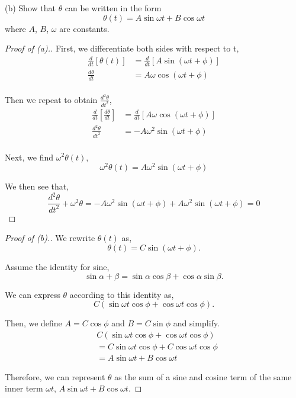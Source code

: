 \documentclass[../hw3.tex]{subfiles}
\begin{document}
(b) Show that $\theta$ can be written in the form
\[\theta(t) = A\sin{\omega t} + B\cos{\omega t}\]
where $A$, $B$, $\omega$ are constants.

\begin{proof}[Proof of (a).]

First, we differentiate both sides with respect to t,
\begin{align*}
    \frac{d}{dt} \left[ \theta(t) \right] &= \frac{d}{dt} \left[ A\sin{(\omega t + \phi)} \right]\\
    \frac{d\theta}{dt} &= A \omega \cos{(\omega t + \phi)} \\
\end{align*}

Then we repeat to obtain $\frac{d^2\theta}{dt^2}$, 
\begin{align*}
    \frac{d}{dt}\left[ \frac{d\theta}{dt} \right] &= \frac{d}{dt} \left[ A \omega \cos{(\omega t + \phi)} \right] \\
    \frac{d^2\theta}{dt^2} &= {-A}\omega^2 \sin{(\omega t + \phi)}\\
\end{align*}

Next, we find $\omega^2 \theta(t)$,
\[\omega^2 \theta(t) = A \omega^2 \sin{(\omega t + \phi)}\]

We then see that,
\[\frac{d^2\theta}{dt^2} + \omega^2 \theta = {-A} \omega^2 \sin{(\omega t + \phi)} + A \omega^2 \sin{(\omega t + \phi)} = 0\]

\end{proof}


\begin{proof}[Proof of (b).]

We rewrite $\theta(t)$ as,
\[\theta(t) = C\sin{(\omega t + \phi)}.\]

Assume the identity for sine,
\[\sin{\alpha+\beta} = \sin{\alpha}\cos{\beta}+\cos{\alpha}\sin{\beta}.\]

We can express $\theta$ according to this identity as,
\[C\left( \sin{\omega t}\cos{\phi} + \cos{\omega t}\cos{\phi} \right).\]

Then, we define $A=C\cos{\phi}$ and $B=C\sin{\phi}$ and simplify.
\begin{align*}
    & C\left( \sin{\omega t}\cos{\phi} + \cos{\omega t}\cos{\phi} \right) \\
    &= C\sin{\omega t}\cos{\phi} + C\cos{\omega t}\cos{\phi} \\
    &= A\sin{\omega t} + B\cos{\omega t}
\end{align*}

Therefore, we can represent $\theta$ as the sum of a sine and cosine term of the same inner term $\omega t$, $A\sin{\omega t} + B\cos{\omega t}$.
    
\end{proof}
\end{document}
